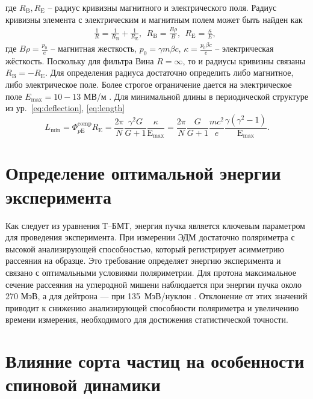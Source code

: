 \noindent где $R_{\mathrm{B}}, R_{\mathrm{E}}$ -- радиус кривизны магнитного и электрического поля. Радиус кривизны элемента с электрическим и магнитным полем может быть найден как
\begin{equation}
	\begin{gathered}
		\frac{1}{R}  = \frac{1}{R_\textrm{B}}+\frac{1}{R_\textrm{E}}, \ \ 
		R_\textrm{B}  = \frac{B\rho}{B}, \ \ 
		R_\textrm{E}  = \frac{\kappa}{E}, \ \ 
	\end{gathered}
\end{equation}
где $B\rho=\frac{p_0}{e}$ – магнитная жесткость, $p_0=\gamma m\beta c$, $\kappa=\frac{p_0\beta c}{e}$ – электрическая жёсткость.
Поскольку для фильтра Вина $R=\infty$, то и радиусы кривизны связаны $R_{\textrm{B}}=-R_{\textrm{E}}$. Для определения радиуса достаточно определить либо магнитное, либо электрическое поле. Более строгое ограничение дается на электрическое поле $E_{\textrm{max}}=10-13$ МВ/м \cite{Wien}. Для минимальной длины в периодической структуре из ур.~\ref{eq:deflection}, \ref{eq:length} 
\begin{equation}
		L_{\text{min}} = \Phi_{p\mathrm{E}}^{\text{comp}}R_{\mathrm{E}}=
		\frac{2\pi}{N}\frac{\gamma^2 G}{G+1}\frac{\kappa}{\mathrm{E}_{\text{max}}}
		 = \frac{2\pi}{N}\frac{G}{G+1}\frac{mc^2}{e}\frac{\gamma(\gamma^2-1)}{\mathrm{E}_{\text{max}}}.
		\label{eq:length_min}
\end{equation}


	\section{Определение оптимальной энергии эксперимента}\label{sec:EDM/requirements/energy}
\par Как следует из уравнения Т–БМТ, энергия пучка является ключевым параметром для проведения эксперимента. При измерении ЭДМ достаточно поляриметра с высокой анализирующей способностью, который регистрирует асимметрию рассеяния на образце. Это требование определяет энергию эксперимента и связано с оптимальными условиями поляриметрии. Для протона максимальное сечение рассеяния на углеродной мишени наблюдается при энергии пучка около 270 МэВ, а для дейтрона — при 135~МэВ/нуклон \cite{JEDI:polarimeter, skhomenko:polarimeter}. Отклонение от этих значений приводит к снижению анализирующей способности поляриметра и увеличению времени измерения, необходимого для достижения статистической точности.

	\section{Влияние сорта частиц на особенности спиновой динамики}\label{sec:EDM/requirements/particles}

